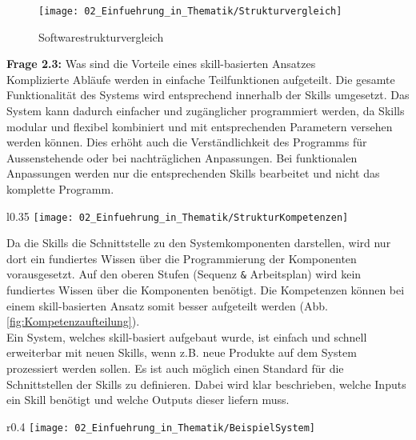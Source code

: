 		\begin{figure}[h!]
			\centering
			\texttt{[image: 02\_Einfuehrung\_in\_Thematik/Strukturvergleich]}
			\captionsetup{justification=centering}
			\caption{Softwarestrukturvergleich}
			\label{fig:Softwarestrukturvergleich}
		\end{figure}
	
	\vspace{3mm}
	
	\textbf{Frage 2.3:} Was sind die Vorteile eines skill-basierten Ansatzes \vspace{2mm} 
	\\
		Komplizierte Abläufe werden in einfache Teilfunktionen aufgeteilt. Die gesamte Funktionalität des Systems wird entsprechend innerhalb der Skills umgesetzt. Das System kann dadurch einfacher und zugänglicher programmiert werden, da Skills modular und flexibel kombiniert und mit entsprechenden Parametern versehen werden können. Dies erhöht auch die Verständlichkeit des Programms für Aussenstehende oder bei nachträglichen Anpassungen. 
		Bei funktionalen Anpassungen werden nur die entsprechenden Skills bearbeitet und nicht das komplette Programm.
		\\
		\begin{wrapfigure}{l}{0.35\textwidth}
			\centering
			\texttt{[image: 02\_Einfuehrung\_in\_Thematik/StrukturKompetenzen]}
			\captionsetup{justification=centering}
			\caption{Kompetenzaufteilung}
			\label{fig:Kompetenzaufteilung}
		\end{wrapfigure}
		Da die Skills die Schnittstelle zu den Systemkomponenten darstellen, wird nur dort ein fundiertes Wissen über die Programmierung der Komponenten vorausgesetzt. Auf den oberen Stufen (Sequenz \verb|&| Arbeitsplan) wird kein fundiertes Wissen über die Komponenten benötigt. Die Kompetenzen können bei einem skill-basierten Ansatz somit besser aufgeteilt werden (Abb. \ref{fig:Kompetenzaufteilung}). 
		\\
		Ein System, welches skill-basiert aufgebaut wurde, ist einfach und schnell erweiterbar mit neuen Skills, wenn z.B. neue Produkte auf dem System prozessiert werden sollen. Es ist auch möglich einen Standard für die Schnittstellen der Skills zu definieren. Dabei wird klar beschrieben, welche Inputs ein Skill benötigt und welche Outputs dieser liefern muss.
		\\
		\vspace{-7mm}
		\begin{wrapfigure}{r}{0.4\textwidth}
			\centering
			\texttt{[image: 02\_Einfuehrung\_in\_Thematik/BeispielSystem]}
			\captionsetup{justification=centering}
			\caption{Beispielszenario}
			\label{fig:Beispielszenario}
		\end{wrapfigure} \par
